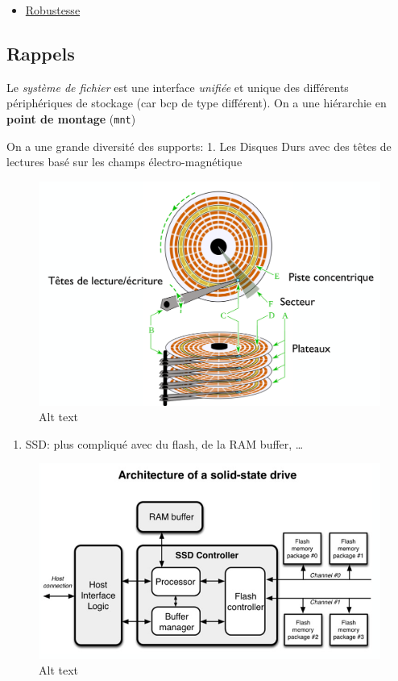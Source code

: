 \begin{itemize}
\begin{itemize}
    \begin{itemize}
    \tightlist
    \item
      \hyperref[robustesse]{Robustesse}
    \end{itemize}
  \end{itemize}
\end{itemize}

\subsection{Rappels}\label{rappels}

Le \emph{système de fichier} est une interface \emph{unifiée} et unique
des différents périphériques de stockage (car bcp de type différent). On
a une hiérarchie en \textbf{point de montage} (\texttt{mnt})

On a une grande diversité des supports: 1. Les Disques Durs avec des
têtes de lectures basé sur les champs électro-magnétique

\begin{figure}
\centering
\includegraphics{image-35.png}
\caption{Alt text}
\end{figure}

\begin{enumerate}
\def\labelenumi{\arabic{enumi}.}
\setcounter{enumi}{1}
\tightlist
\item
  SSD: plus compliqué avec du flash, de la RAM buffer, \ldots{}
\end{enumerate}

\begin{figure}
\centering
\includegraphics{image-36.png}
\caption{Alt text}
\end{figure}

